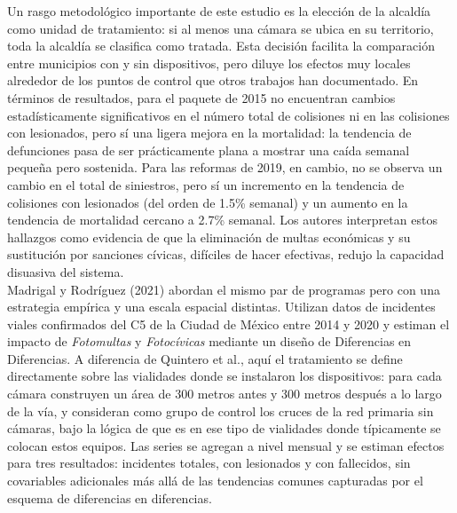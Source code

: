 Un rasgo metodológico importante de este estudio es la elección de la alcaldía como unidad de tratamiento: si al menos una cámara se ubica en su territorio, toda la alcaldía se clasifica como tratada. Esta decisión facilita la comparación entre municipios con y sin dispositivos, pero diluye los efectos muy locales alrededor de los puntos de control que otros trabajos han documentado. En términos de resultados, para el paquete de 2015 no encuentran cambios estadísticamente significativos en el número total de colisiones ni en las colisiones con lesionados, pero sí una ligera mejora en la mortalidad: la tendencia de defunciones pasa de ser prácticamente plana a mostrar una caída semanal pequeña pero sostenida. Para las reformas de 2019, en cambio, no se observa un cambio en el total de siniestros, pero sí un incremento en la tendencia de colisiones con lesionados (del orden de 1.5\% semanal) y un aumento en la tendencia de mortalidad cercano a 2.7\% semanal. Los autores interpretan estos hallazgos como evidencia de que la eliminación de multas económicas y su sustitución por sanciones cívicas, difíciles de hacer efectivas, redujo la capacidad disuasiva del sistema.\\

Madrigal y Rodríguez (2021) abordan el mismo par de programas pero con una estrategia empírica y una escala espacial distintas. Utilizan datos de incidentes viales confirmados del C5 de la Ciudad de México entre 2014 y 2020 y estiman el impacto de \emph{Fotomultas} y \emph{Fotoc\'ivicas} mediante un diseño de Diferencias en Diferencias. A diferencia de Quintero et al., aquí el tratamiento se define directamente sobre las vialidades donde se instalaron los dispositivos: para cada cámara construyen un área de 300 metros antes y 300 metros después a lo largo de la vía, y consideran como grupo de control los cruces de la red primaria sin cámaras, bajo la lógica de que es en ese tipo de vialidades donde típicamente se colocan estos equipos. Las series se agregan a nivel mensual y se estiman efectos para tres resultados: incidentes totales, con lesionados y con fallecidos, sin covariables adicionales más allá de las tendencias comunes capturadas por el esquema de diferencias en diferencias.\\

